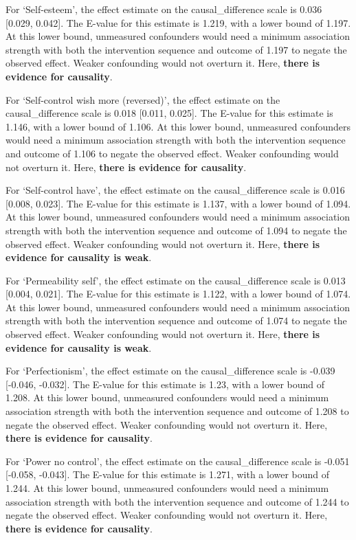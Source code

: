 \documentclass[
  single column]{article}
\begin{document}
For `Self-esteem', the effect estimate on the causal\_difference scale
is 0.036 {[}0.029, 0.042{]}. The E-value for this estimate is 1.219,
with a lower bound of 1.197. At this lower bound, unmeasured confounders
would need a minimum association strength with both the intervention
sequence and outcome of 1.197 to negate the observed effect. Weaker
confounding would not overturn it. Here, \textbf{there is evidence for
causality}.

For `Self-control wish more (reversed)', the effect estimate on the
causal\_difference scale is 0.018 {[}0.011, 0.025{]}. The E-value for
this estimate is 1.146, with a lower bound of 1.106. At this lower
bound, unmeasured confounders would need a minimum association strength
with both the intervention sequence and outcome of 1.106 to negate the
observed effect. Weaker confounding would not overturn it. Here,
\textbf{there is evidence for causality}.

For `Self-control have', the effect estimate on the causal\_difference
scale is 0.016 {[}0.008, 0.023{]}. The E-value for this estimate is
1.137, with a lower bound of 1.094. At this lower bound, unmeasured
confounders would need a minimum association strength with both the
intervention sequence and outcome of 1.094 to negate the observed
effect. Weaker confounding would not overturn it. Here, \textbf{there is
evidence for causality is weak}.

For `Permeability self', the effect estimate on the causal\_difference
scale is 0.013 {[}0.004, 0.021{]}. The E-value for this estimate is
1.122, with a lower bound of 1.074. At this lower bound, unmeasured
confounders would need a minimum association strength with both the
intervention sequence and outcome of 1.074 to negate the observed
effect. Weaker confounding would not overturn it. Here, \textbf{there is
evidence for causality is weak}.

For `Perfectionism', the effect estimate on the causal\_difference scale
is -0.039 {[}-0.046, -0.032{]}. The E-value for this estimate is 1.23,
with a lower bound of 1.208. At this lower bound, unmeasured confounders
would need a minimum association strength with both the intervention
sequence and outcome of 1.208 to negate the observed effect. Weaker
confounding would not overturn it. Here, \textbf{there is evidence for
causality}.

For `Power no control', the effect estimate on the causal\_difference
scale is -0.051 {[}-0.058, -0.043{]}. The E-value for this estimate is
1.271, with a lower bound of 1.244. At this lower bound, unmeasured
confounders would need a minimum association strength with both the
intervention sequence and outcome of 1.244 to negate the observed
effect. Weaker confounding would not overturn it. Here, \textbf{there is
evidence for causality}.
\end{document}
